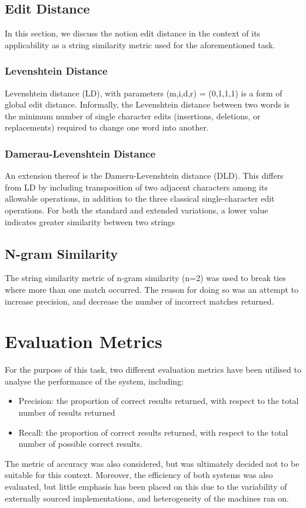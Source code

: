 \documentclass[11pt]{article}
\begin{document}
\subsection{Edit Distance}
In this section, we discuss the notion edit distance in the context of its applicability as a string similarity metric used for the aforementioned task. 

\subsubsection{Levenshtein Distance}
Levenshtein distance (LD), with parameters (m,i,d,r) = (0,1,1,1) is a form of global edit distance. Informally, the Levenshtein distance between two words is the minimum number of single character edits (insertions, deletions, or replacements) required to change one word into another. 

\subsubsection{Damerau-Levenshtein Distance}
An extension thereof is the Dameru-Levenshtein distance (DLD). This differs from LD by including transposition of two adjacent characters among its allowable operations, in addition to the three classical  single-character edit operations. For both the standard and extended variations, a lower value indicates greater similarity between two strings

\subsection{N-gram Similarity}
The string similarity metric of n-gram similarity (n=2) was used to break ties where more than one match occurred. The reason for doing so was an attempt to increase precision, and decrease the number of incorrect matches returned.


\section{Evaluation Metrics}
For the purpose of this task, two different evaluation metrics have been utilised to analyse the performance of the system, including:
\begin{itemize}
\item Precision: the proportion of correct results returned, with respect to the total number of results returned
\item Recall: the proportion of correct results returned, with respect to the total number of possible correct results.
\end{itemize}
The metric of accuracy was also considered, but was ultimately decided not to be suitable for this context.
Moreover, the efficiency of both systems was also evaluated, but little emphasis has been placed on this
due to the variability of externally sourced implementations, and heterogeneity of the machines ran on.
\end{document}
